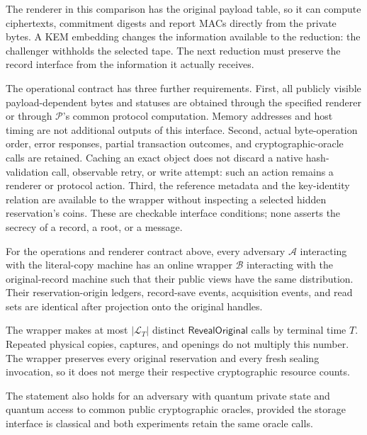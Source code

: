 The renderer in this comparison has the original payload table, so it can
compute ciphertexts, commitment digests and report MACs directly from the
private bytes. A KEM embedding changes the information available to the
reduction: the challenger withholds the selected tape. The next reduction
must preserve the record interface from the information it actually receives.

The operational contract has three further requirements.
First, all publicly visible payload-dependent bytes and statuses are obtained
through the specified renderer or through $\mathcal P$'s common protocol
computation.  Memory addresses and host timing are not additional outputs of
this interface.
Second, actual byte-operation order, error responses, partial transaction
outcomes, and cryptographic-oracle calls are retained.  Caching an exact
object does not discard a native hash-validation call, observable retry, or
write attempt: such an action remains a renderer or protocol action.
Third, the reference metadata and the key-identity relation are available to
the wrapper without inspecting a selected hidden reservation's coins.
These are checkable interface conditions; none asserts the secrecy of a
record, a root, or a message.

\begin{lemma}
\label{lem:alias-normalization}
For the operations and renderer contract above, every adversary
$\mathcal A$ interacting with the literal-copy machine has an online wrapper
$\mathcal B$ interacting with the original-record machine such that their
public views have the same distribution.  Their reservation-origin ledgers,
record-save events, acquisition events, and read sets are identical after
projection onto the original handles.

The wrapper makes at most $|\mathcal L_T|$ distinct
$\mathsf{RevealOriginal}$ calls by terminal time $T$.  Repeated physical
copies, captures, and openings do not multiply this number.  The wrapper
preserves every original reservation and every fresh sealing invocation, so
it does not merge their respective cryptographic resource counts.

The statement also holds for an adversary with quantum private state and
quantum access to common public cryptographic oracles, provided the storage
interface is classical and both experiments retain the same oracle calls.
\end{lemma}

